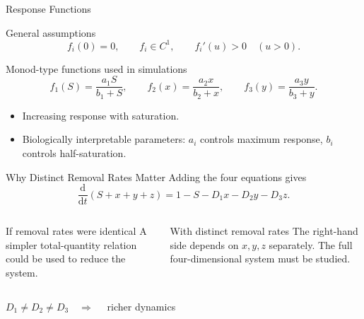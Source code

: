 \documentclass[aspectratio=169,10pt]{beamer}
\newcommand{\dd}{\mathrm{d}}
\begin{document}
\begin{frame}{Response Functions}
\begin{block}{General assumptions}
\[
f_i(0)=0, \qquad f_i\in C^1, \qquad f_i'(u)>0 \quad (u>0).
\]
\end{block}
\vspace{0.5em}
\begin{block}{Monod-type functions used in simulations}
\[
f_1(S)=\frac{a_1S}{b_1+S},\qquad
f_2(x)=\frac{a_2x}{b_2+x},\qquad
f_3(y)=\frac{a_3y}{b_3+y}.
\]
\end{block}
\begin{itemize}
  \item Increasing response with saturation.
  \item Biologically interpretable parameters: $a_i$ controls maximum response, $b_i$ controls half-saturation.
\end{itemize}
\end{frame}

\begin{frame}{Why Distinct Removal Rates Matter}
Adding the four equations gives
\[
\frac{\dd}{\dd t}(S+x+y+z)=1-S-D_1x-D_2y-D_3z.
\]
\vspace{0.3em}
\begin{columns}[T,onlytextwidth]
\begin{block}{If removal rates were identical}
A simpler total-quantity relation could be used to reduce the system.
\end{block}
\begin{alertblock}{With distinct removal rates}
The right-hand side depends on $x,y,z$ separately. The full four-dimensional system must be studied.
\end{alertblock}
\end{columns}
\vspace{0.6em}
\centering
\Large $D_1\neq D_2\neq D_3 \quad \Rightarrow \quad$ richer dynamics
\end{frame}
\end{document}

